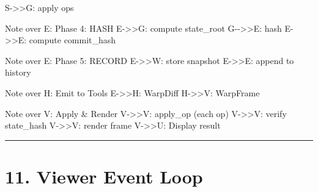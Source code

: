 \documentclass[
]{book}
\newenvironment{Shaded}{}{}
\newcommand{\NormalTok}[1]{#1}
\begin{document}
\begin{Shaded}
\begin{Highlighting}[]
\NormalTok{    S{-}\textgreater{}\textgreater{}G: apply ops}

\NormalTok{    Note over E: Phase 4: HASH}
\NormalTok{    E{-}\textgreater{}\textgreater{}G: compute state\_root}
\NormalTok{    G{-}{-}\textgreater{}\textgreater{}E: hash}
\NormalTok{    E{-}\textgreater{}\textgreater{}E: compute commit\_hash}

\NormalTok{    Note over E: Phase 5: RECORD}
\NormalTok{    E{-}\textgreater{}\textgreater{}W: store snapshot}
\NormalTok{    E{-}\textgreater{}\textgreater{}E: append to history}

\NormalTok{    Note over H: Emit to Tools}
\NormalTok{    E{-}\textgreater{}\textgreater{}H: WarpDiff}
\NormalTok{    H{-}\textgreater{}\textgreater{}V: WarpFrame}

\NormalTok{    Note over V: Apply \& Render}
\NormalTok{    V{-}\textgreater{}\textgreater{}V: apply\_op (each op)}
\NormalTok{    V{-}\textgreater{}\textgreater{}V: verify state\_hash}
\NormalTok{    V{-}\textgreater{}\textgreater{}V: render frame}
\NormalTok{    V{-}\textgreater{}\textgreater{}U: Display result}
\end{Highlighting}
\end{Shaded}

\begin{center}\rule{0.5\linewidth}{0.5pt}\end{center}

\section{11. Viewer Event Loop}\label{viewer-event-loop}
\end{document}
